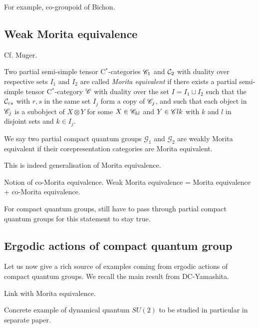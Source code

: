 For example, co-groupoid of Bichon. 


\subsection{Weak Morita equivalence}

Cf. Muger. 

\begin{Def} Two partial semi-simple tensor C$^*$-categories $\mathscr{C}_1$ and $\mathcal{C}_2$ with duality over respective sets $I_1$ and $I_2$ are called \emph{Morita equivalent} if there exists a partial semi-simple tensor C$^*$-category $\mathscr{C}$ with duality over the set $I=I_1\sqcup I_2$ such that the $\mathcal{C}_{rs}$ with $r,s$ in the same set $I_j$ form a copy of $\mathscr{C}_j$, and such that each object in $\mathscr{C}_{j}$ is a subobject of $X\otimes Y$ for some $X\in \mathscr{C}_{kl}$ and $Y\in \mathscr{C}{lk}$ with $k$ and $l$ in disjoint sets and $k\in I_j$. %

We say two partial compact quantum groups $\mathscr{G}_1$ and $\mathscr{G}_2$ are weakly Morita equivalent if their corepresentation categories are Morita equivalent. %
\end{Def} 

This is indeed generalisation of Morita equivalence. 

Notion of co-Morita equivalence. Weak Morita equivalence = Morita equivalence + co-Morita equivalence. 

For compact quantum groups, still have to pass through partial compact quantum groups for this statement to stay true.



\subsection{Ergodic actions of compact quantum group}

Let us now give a rich source of examples coming from ergodic actions of compact quantum groups. We recall the main result from DC-Yamashita.

Link with Morita equivalence. 

Concrete example of dynamical quantum $SU(2)$ to be studied in particular in separate paper. 









